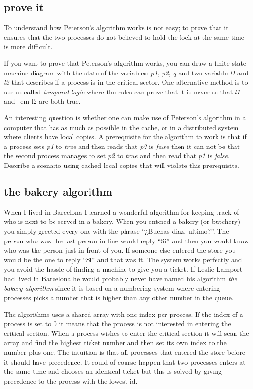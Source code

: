 \documentclass[a4paper,11pt]{article}
\begin{document}
\subsection{prove it}

To understand how Peterson's algorithm works is not easy; to prove
that it ensures that the two processes do not believed to hold the
lock at the same time is more difficult. 
 
If you want to prove that Peterson's algorithm works, you can draw a
finite state machine diagram with the state of the variables: {\em
  p1}, {\em p2}, {\em q} and two variable {\em l1} and {\em l2} that
describes if a process is in the critical sector. One alternative
method is to use so-called {\em temporal logic} where the rules can
prove that it is never so that {\em l1} and {\ em l2} are both true.

An interesting question is whether one can make use of Peterson's
algorithm in a computer that has as much as possible in the cache, or
in a distributed system where clients have local copies. A
prerequisite for the algorithm to work is that if a process sets {\em
  p1} to {\em true} and then reads that {\em p2} is {\em false} then
it can not be that the second process manages to set {\em p2} to {\em
  true} and then read that {\em p1} is {\em false}. Describe a
scenario using cached local copies that will violate this prerequisite. 

\subsection{the bakery algorithm}

When I lived in Barcelona I learned a wonderful algorithm for keeping
track of who is next to be served in a bakery. When you entered a
bakery (or butchery) you simply greeted every one with the phrase
``¿Buenas diaz, ultimo?''. The person who was the last person in line
would reply ``Si'' and then you would know who was the person just in
front of you. If someone else entered the store you would be the one
to reply ``Si'' and that was it. The system works perfectly and you
avoid the hassle of finding a machine to give you a ticket. If Leslie
Lamport had lived in Barcelona he would probably never have named his
algorithm {\em the bakery algorithm} since it is based on a numbering
system where entering processes picks a number that is higher than any
other number in the queue.

The algorithms uses a shared array with one index per process. If the
index of a process is set to $0$
it means that the process is not interested in entering the
critical section. When a process wishes to enter the critical section it
will scan the array and find the highest ticket number and then set
its own index to the number plus one. The intuition is that all
processes that entered the store before it should have precedence. It
could of course happen that two processes enters at the same time and
chooses an identical ticket but this is solved by giving precedence to
the process with the lowest id.
\end{document}
